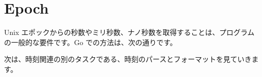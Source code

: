 \section{Epoch}

Unix エポックからの秒数やミリ秒数、ナノ秒数を取得することは、プログラムの一般的な要件です。Go での方法は、次の通りです。




次は、時刻関連の別のタスクである、時刻のパースとフォーマットを見ていきます。
